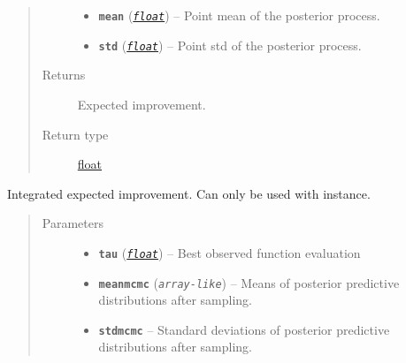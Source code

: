 \documentclass[letterpaper,10pt,english]{sphinxmanual}
\begin{document}
\begin{fulllineitems}
\begin{fulllineitems}
\begin{quote}
\begin{description}
\begin{itemize}
\item {} 
\textbf{\texttt{mean}} (\href{https://docs.python.org/2/library/functions.html\#float}{\emph{\texttt{float}}}) -- Point mean of the posterior process.

\item {} 
\textbf{\texttt{std}} (\href{https://docs.python.org/2/library/functions.html\#float}{\emph{\texttt{float}}}) -- Point std of the posterior process.

\end{itemize}

\item[{Returns}] \leavevmode
Expected improvement.

\item[{Return type}] \leavevmode
\href{https://docs.python.org/2/library/functions.html\#float}{float}

\end{description}\end{quote}

\end{fulllineitems}


\begin{fulllineitems}
\label{pyGPGO.acquisition:pyGPGO.acquisition.Acquisition.IntegratedExpectedImprovement}
Integrated expected improvement. Can only be used with  instance.
\begin{quote}\begin{description}
\item[{Parameters}] \leavevmode\begin{itemize}
\item {} 
\textbf{\texttt{tau}} (\href{https://docs.python.org/2/library/functions.html\#float}{\emph{\texttt{float}}}) -- Best observed function evaluation

\item {} 
\textbf{\texttt{meanmcmc}} (\emph{\texttt{array-like}}) -- Means of posterior predictive distributions after sampling.

\item {} 
\textbf{\texttt{stdmcmc}} -- Standard deviations of posterior predictive distributions after sampling.

\end{itemize}


\end{description}
\end{quote}
\end{fulllineitems}
\end{fulllineitems}
\end{document}

